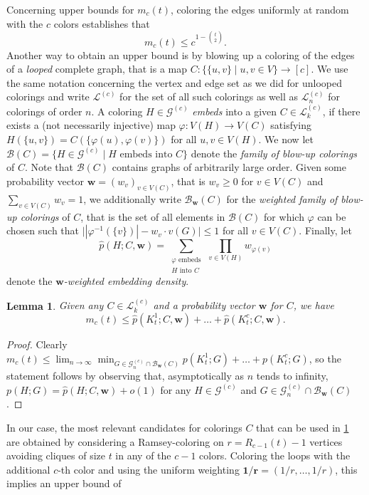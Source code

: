 \documentclass[a4paper,11pt]{article}
\newtheorem{lemma}[theorem]{Lemma}
\numberwithin{equation}{section}
\newcommand{\mB}{\mathcal{B}}
\newcommand{\mG}{\mathcal{G}}
\newcommand{\mL}{\mathcal{L}}
\newcommand{\bw}{\mathbf{w}}
\begin{document}
Concerning upper bounds for $m_c(t)$, coloring the edges uniformly at random with the $c$ colors establishes that
%
\begin{equation} \label{eq:prob_upper}
    m_c(t) \leq c^{1 - {t \choose 2}}.
\end{equation}
%
Another way to obtain an upper bound is by blowing up a coloring of the edges of a \emph{looped} complete graph, that is a map $C: \big\{ \{u, v\} \mid u, v \in V \big\} \to [c]$. We use the same notation concerning the vertex and edge set as we did for unlooped colorings and write $\mL^{(c)}$ for the set of all such colorings as well as $\mL_n^{(c)}$ for colorings of order $n$. A coloring $H \in \mG^{(c)}$ \emph{embeds} into a given $C \in \mL^{(c)}_k$, if there exists a (not necessarily injective) map $\varphi: V(H) \to V(C)$ satisfying $H( \{u, v \} ) = C ( \{ \varphi(u), \varphi(v) \})$ for all  $u, v \in V(H)$.
We now let $\mB (C) = \{ H \in \mG^{(c)} \mid H \text{ embeds into } C \}$ denote the \emph{family of blow-up colorings} of $C$. Note that $\mB (C)$ contains graphs of arbitrarily large order. 
Given some probability vector $\bw = (w_v)_{v\in V(C)}$, that is $w_v \geq 0$ for $v \in V(C)$ and $\sum_{v\in V(C)}w_v = 1$, we additionally write $\mB_\bw (C)$ for the \emph{weighted family of blow-up colorings} of $C$, that is the set of all elements in $\mB (C)$ for which $\varphi$ can be chosen such that $\big| |\varphi^{-1}(\{v\})| - w_v \cdot v(G) \big| \leq 1$ for all $v\in V(C)$. Finally, let
%
\begin{equation*}
    \hat{p}(H; C, \bw) = \sum_{\substack{\varphi\text{ embeds}\\H \text{ into } C}} \, \prod_{v\in V(H)} w_{\varphi(v)}
\end{equation*}
%
denote the \emph{$\bw$-weighted embedding density}.
%
\begin{lemma} \label{lemma:blowup}
    Given any $C \in \mL^{(c)}_k$ and a probability vector $\bw$ for $C$, we have 
    \[
        m_c(t) \leq \hat{p}(K_t^1; C, \bw) + \ldots + \hat{p}(K_t^c; C, \bw).
    \]
\end{lemma}
%
\begin{proof}
    Clearly $m_c(t) \leq \lim_{n \to \infty} \min_{G \in \mG_n^{(c)} \cap \mB_\bw(C)} p(K_t^1; G) + \ldots + p(K_t^c; G)$, so the statement follows by observing that, asymptotically as $n$ tends to infinity, $p(H;G) = \hat{p}(H; C, \bw) + o(1)$ for any $H \in \mG^{(c)}$ and $G \in \mG_n^{(c)} \cap \mB_\bw(C)$.
\end{proof}
%
In our case, the most relevant candidates for colorings $C$ that can be used in \cref{lemma:blowup} are obtained by considering a Ramsey-coloring on $r = R_{c-1}(t) - 1$ vertices avoiding cliques of size $t$ in any of the $c-1$ colors. Coloring the loops with the additional $c$-th color and using the uniform weighting $\mathbf{1 / r} = (1/r, \ldots, 1/r)$, this implies an upper bound of
\end{document}
